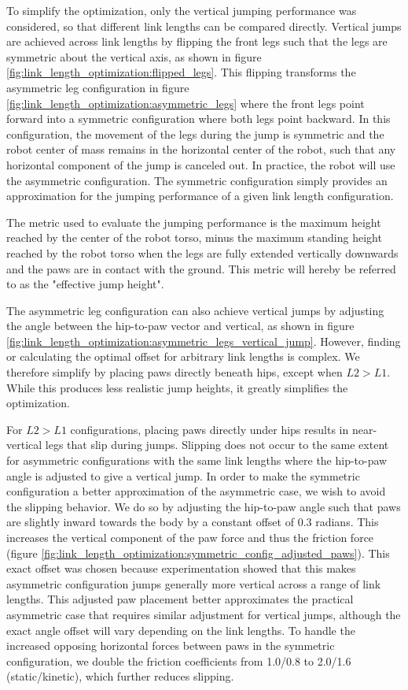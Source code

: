To simplify the optimization, only the vertical jumping performance was considered, so that different link lengths can be compared directly. Vertical jumps are achieved across link lengths by flipping the front legs such that the legs are symmetric about the vertical axis, as shown in figure \ref{fig:link_length_optimization:flipped_legs}. This flipping transforms the asymmetric leg configuration in figure \ref{fig:link_length_optimization:asymmetric_legs} where the front legs point forward into a symmetric configuration where both legs point backward. In this configuration, the movement of the legs during the jump is symmetric and the robot center of mass remains in the horizontal center of the robot, such that any horizontal component of the jump is canceled out. In practice, the robot will use the asymmetric configuration. The symmetric configuration simply provides an approximation for the jumping performance of a given link length configuration.

The metric used to evaluate the jumping performance is the maximum height reached by the center of the robot torso, minus the maximum standing height reached by the robot torso when the legs are fully extended vertically downwards and the paws are in contact with the ground. This metric will hereby be referred to as the "effective jump height".

The asymmetric leg configuration can also achieve vertical jumps by adjusting the angle between the hip-to-paw vector and vertical, as shown in figure \ref{fig:link_length_optimization:asymmetric_legs_vertical_jump}. However, finding or calculating the optimal offset for arbitrary link lengths is complex. We therefore simplify by placing paws directly beneath hips, except when $L2>L1$. While this produces less realistic jump heights, it greatly simplifies the optimization.

For $L2>L1$ configurations, placing paws directly under hips results in near-vertical legs that slip during jumps. Slipping does not occur to the same extent for asymmetric configurations with the same link lengths where the hip-to-paw angle is adjusted to give a vertical jump. In order to make the symmetric configuration a better approximation of the asymmetric case, we wish to avoid the slipping behavior. We do so by adjusting the hip-to-paw angle such that paws are slightly inward towards the body by a constant offset of 0.3 radians. This increases the vertical component of the paw force and thus the friction force (figure \ref{fig:link_length_optimization:symmetric_config_adjusted_paws}). This exact offset was chosen because experimentation showed that this makes asymmetric configuration jumps generally more vertical across a range of link lengths. This adjusted paw placement better approximates the practical asymmetric case that requires similar adjustment for vertical jumps, although the exact angle offset will vary depending on the link lengths. To handle the increased opposing horizontal forces between paws in the symmetric configuration, we double the friction coefficients from 1.0/0.8 to 2.0/1.6 (static/kinetic), which further reduces slipping.

